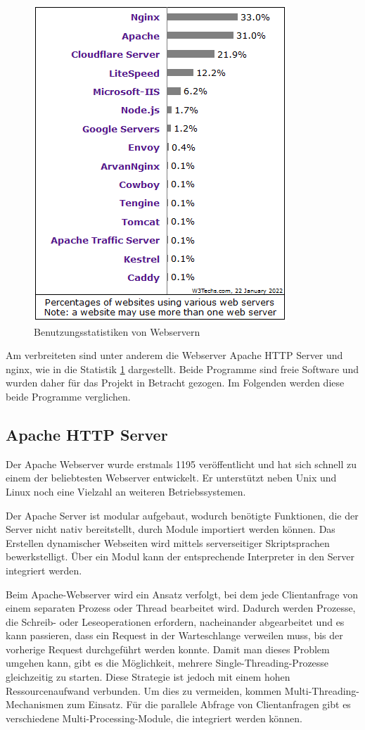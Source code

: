 \begin{figure}[htbp]
	\centering
	\includegraphics{images/StatistikWebserver.png}
	\caption{Benutzungsstatistiken von Webservern \cite{w3techs}}
	\label{fig:WebserverStatistik}
\end{figure}

Am verbreiteten sind unter anderem die Webserver Apache HTTP Server und nginx, wie in die Statistik \ref{fig:WebserverStatistik} dargestellt. Beide Programme sind freie Software und wurden daher für das Projekt in Betracht gezogen. Im Folgenden werden diese beide Programme verglichen.


\subsection{Apache HTTP Server}
Der Apache Webserver wurde erstmals 1195 veröffentlicht und hat sich schnell zu einem der beliebtesten Webserver entwickelt. Er unterstützt neben Unix und Linux noch eine Vielzahl an weiteren Betriebssystemen.

Der Apache Server ist modular aufgebaut, wodurch benötigte Funktionen, die der Server nicht nativ bereitstellt, durch Module importiert werden können. Das Erstellen dynamischer Webseiten wird mittels serverseitiger Skriptsprachen bewerkstelligt. Über ein Modul kann der entsprechende Interpreter in den Server integriert werden.

Beim Apache-Webserver wird ein Ansatz verfolgt, bei dem jede Clientanfrage von einem separaten Prozess oder Thread bearbeitet wird. Dadurch werden Prozesse, die Schreib- oder Leseoperationen erfordern, nacheinander abgearbeitet und es kann passieren, dass ein Request in der Warteschlange verweilen muss, bis der vorherige Request durchgeführt werden konnte. Damit man dieses Problem umgehen kann, gibt es die Möglichkeit, mehrere Single-Threading-Prozesse gleichzeitig zu starten. Diese Strategie ist jedoch mit einem hohen Ressourcenaufwand verbunden. Um dies zu vermeiden, kommen Multi-Threading-Mechanismen zum Einsatz. Für die parallele Abfrage von Clientanfragen gibt es verschiedene Multi-Processing-Module, die integriert werden können.



